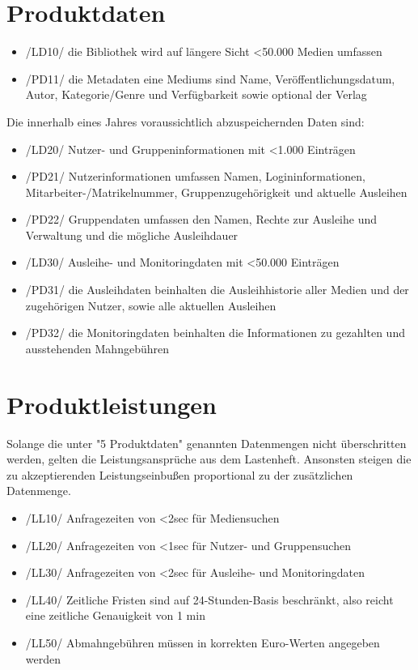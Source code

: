 \documentclass[12pt, a4paper]{article}
\begin{document}
\section{Produktdaten}
\begin{itemize}
	\item /LD10/ die Bibliothek wird auf längere Sicht <50.000 Medien umfassen
	\item /PD11/ die Metadaten eine Mediums sind Name, Veröffentlichungsdatum, Autor, Kategorie/Genre und Verfügbarkeit sowie optional der Verlag 
\end{itemize}

Die innerhalb eines Jahres voraussichtlich abzuspeichernden Daten sind:
\begin{itemize}
	\item /LD20/ Nutzer- und Gruppeninformationen mit <1.000 Einträgen
	\item /PD21/ Nutzerinformationen umfassen Namen, Logininformationen, Mitarbeiter-/Matrikelnummer, Gruppenzugehörigkeit und aktuelle Ausleihen
	\item /PD22/ Gruppendaten umfassen den Namen, Rechte zur Ausleihe und Verwaltung und die mögliche Ausleihdauer
	\item /LD30/ Ausleihe- und Monitoringdaten mit <50.000 Einträgen
	\item /PD31/ die Ausleihdaten beinhalten die Ausleihhistorie aller Medien und der zugehörigen Nutzer, sowie alle aktuellen Ausleihen 
	\item /PD32/ die Monitoringdaten beinhalten die Informationen zu gezahlten und ausstehenden Mahngebühren
\end{itemize}
\pagebreak

\section{Produktleistungen}
Solange die unter "5 Produktdaten" genannten Datenmengen nicht überschritten werden, gelten die Leistungsansprüche aus dem Lastenheft. Ansonsten steigen die zu akzeptierenden Leistungseinbußen proportional zu der zusätzlichen Datenmenge.
\begin{itemize}
	\item /LL10/ Anfragezeiten von <2sec für Mediensuchen
	\item /LL20/ Anfragezeiten von <1sec für Nutzer- und Gruppensuchen
	\item /LL30/ Anfragezeiten von <2sec für Ausleihe- und Monitoringdaten
	\item /LL40/ Zeitliche Fristen sind auf 24-Stunden-Basis beschränkt, also reicht eine zeitliche Genauigkeit von 1 min
	\item /LL50/ Abmahngebühren müssen in korrekten Euro-Werten angegeben werden
\end{itemize}
\pagebreak
\end{document}
